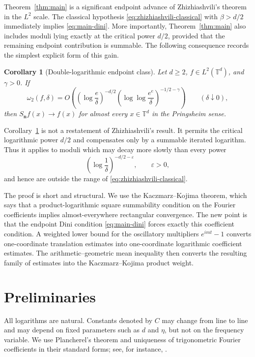\documentclass[11pt,reqno]{amsart}
\numberwithin{equation}{section}
\theoremstyle{plain}
\newtheorem{corollary}[theorem]{Corollary}
\theoremstyle{definition}
\theoremstyle{remark}
\newcommand{\T}{\mathbb T}
\newcommand{\eps}{\varepsilon}
\begin{document}
Theorem~\ref{thm:main} is a significant endpoint advance of Zhizhiashvili's theorem in the $L^2$ scale. The classical hypothesis \eqref{eq:zhizhiashvili-classical} with $\beta>d/2$ immediately implies \eqref{eq:main-dini}. More importantly, Theorem~\ref{thm:main} also includes moduli lying exactly at the critical power $d/2$, provided that the remaining endpoint contribution is summable. The following consequence records the simplest explicit form of this gain.

\begin{corollary}[Double-logarithmic endpoint class]\label{cor:double-log}
Let $d\ge2$, $f\in L^2(\T^d)$, and $\gamma>0$. If
\begin{equation}\label{eq:double-log-assumption}
 \omega_2(f,\delta)=O\left(
 \left(\log\frac e\delta\right)^{-d/2}
 \left(\log\log\frac{e^e}{\delta}\right)^{-1/2-\gamma}
 \right)
 \qquad(\delta\downarrow0),
\end{equation}
then $S_{\mathbf n}f(x)\to f(x)$ for almost every $x\in\T^d$ in the Pringsheim sense.
\end{corollary}

Corollary~\ref{cor:double-log} is not a restatement of Zhizhiashvili's result. It permits the critical logarithmic power $d/2$ and compensates only by a summable iterated logarithm. Thus it applies to moduli which may decay more slowly than every power
\[
 \left(\log\frac1\delta\right)^{-d/2-\eps},\qquad \eps>0,
\]
and hence are outside the range of \eqref{eq:zhizhiashvili-classical}.

The proof is short and structural. We use the Kaczmarz--Kojima theorem, which says that a product-logarithmic square summability condition on the Fourier coefficients implies almost-everywhere rectangular convergence. The new point is that the endpoint Dini condition \eqref{eq:main-dini} forces exactly this coefficient condition. A weighted lower bound for the oscillatory multipliers $e^{imt}-1$ converts one-coordinate translation estimates into one-coordinate logarithmic coefficient estimates. The arithmetic--geometric mean inequality then converts the resulting family of estimates into the Kaczmarz--Kojima product weight.

\section{Preliminaries}

All logarithms are natural. Constants denoted by $C$ may change from line to line and may depend on fixed parameters such as $d$ and $\eta$, but not on the frequency variable. We use Plancherel's theorem and uniqueness of trigonometric Fourier coefficients in their standard forms; see, for instance, \cite{Zygmund2002}.
\end{document}
